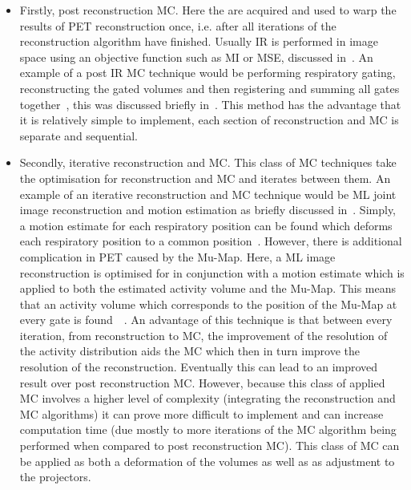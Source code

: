             \begin{itemize}
                \item Firstly, post reconstruction \gls{MC}. Here the  are acquired and used to warp the results of \gls{PET} reconstruction once, i.e. after all iterations of the reconstruction algorithm have finished. Usually \gls{IR} is performed in image space using an objective function such as \gls{MI} or \gls{MSE}, discussed in~. An example of a post \gls{IR} \gls{MC} technique would be performing respiratory gating, reconstructing the gated volumes and then registering and summing all gates together~, this was discussed briefly in~. This method has the advantage that it is relatively simple to implement, each section of reconstruction and \gls{MC} is separate and sequential.
                
                \item Secondly, iterative reconstruction and \gls{MC}. This class of \gls{MC} techniques take the optimisation for reconstruction and \gls{MC} and iterates between them. An example of an iterative reconstruction and \gls{MC} technique would be \gls{ML} joint image reconstruction and motion estimation as briefly discussed in~. Simply, a motion estimate for each respiratory position can be found which deforms each respiratory position to a common position~. However, there is additional complication in \gls{PET} caused by the \gls{Mu-Map}. Here, a \gls{ML} image reconstruction is optimised for in conjunction with a motion estimate which is applied to both the estimated activity volume and the \gls{Mu-Map}. This means that an activity volume which corresponds to the position of the \gls{Mu-Map} at every gate is found~~. An advantage of this technique is that between every iteration, from reconstruction to \gls{MC}, the improvement of the resolution of the activity distribution aids the \gls{MC} which then in turn improve the resolution of the reconstruction. Eventually this can lead to an improved result over post reconstruction \gls{MC}. However, because this class of applied \gls{MC} involves a higher level of complexity (integrating the reconstruction and \gls{MC} algorithms) it can prove more difficult to implement and can increase computation time (due mostly to more iterations of the \gls{MC} algorithm being performed when compared to post reconstruction \gls{MC}). This class of \gls{MC} can be applied as both a deformation of the volumes as well as as adjustment to the projectors.
                

\end{itemize}
